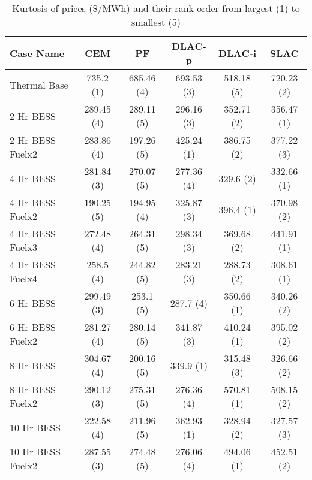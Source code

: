 \begin{table}[htp]
\centering
\begin{tabular}{lccccc}
\hline
\textbf{Case Name} & CEM & PF & DLAC-p & DLAC-i & SLAC \\
\hline
Thermal Base & 735.2 (1) & 685.46 (4) & 693.53 (3) & 518.18 (5) & 720.23 (2) \\
2 Hr BESS & 289.45 (4) & 289.11 (5) & 296.16 (3) & 352.71 (2) & 356.47 (1) \\
2 Hr BESS Fuelx2 & 283.86 (4) & 197.26 (5) & 425.24 (1) & 386.75 (2) & 377.22 (3) \\
4 Hr BESS & 281.84 (3) & 270.07 (5) & 277.36 (4) & 329.6 (2) & 332.66 (1) \\
4 Hr BESS Fuelx2 & 190.25 (5) & 194.95 (4) & 325.87 (3) & 396.4 (1) & 370.98 (2) \\
4 Hr BESS Fuelx3 & 272.48 (4) & 264.31 (5) & 298.34 (3) & 369.68 (2) & 441.91 (1) \\
4 Hr BESS Fuelx4 & 258.5 (4) & 244.82 (5) & 283.21 (3) & 288.73 (2) & 308.61 (1) \\
6 Hr BESS & 299.49 (3) & 253.1 (5) & 287.7 (4) & 350.66 (1) & 340.26 (2) \\
6 Hr BESS Fuelx2 & 281.27 (4) & 280.14 (5) & 341.87 (3) & 410.24 (1) & 395.02 (2) \\
8 Hr BESS & 304.67 (4) & 200.16 (5) & 339.9 (1) & 315.48 (3) & 326.66 (2) \\
8 Hr BESS Fuelx2 & 290.12 (3) & 275.31 (5) & 276.36 (4) & 570.81 (1) & 508.15 (2) \\
10 Hr BESS & 222.58 (4) & 211.96 (5) & 362.93 (1) & 328.94 (2) & 327.57 (3) \\
10 Hr BESS Fuelx2 & 287.55 (3) & 274.48 (5) & 276.06 (4) & 494.06 (1) & 452.51 (2) \\
\hline
\end{tabular}
\caption{Kurtosis of prices (\$/MWh) and their rank order from largest (1) to smallest (5)}
\label{tab:std_with_ranks}
\end{table}
